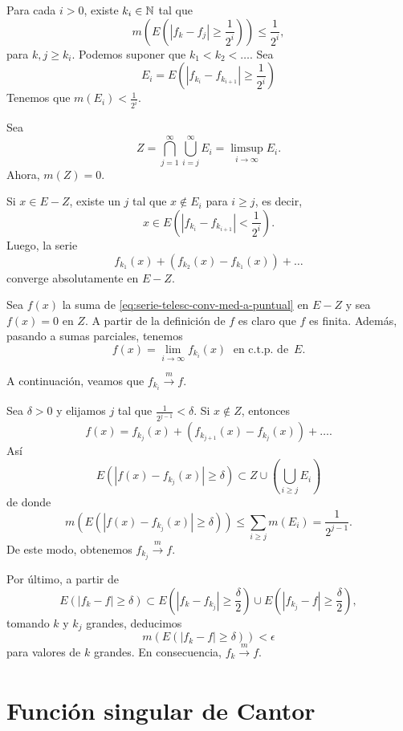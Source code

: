 \begin{demo}
Para cada $i>0$, existe $k_i\in \mathbb{N}$ tal que 
\[
m\left(E\left(|f_k-f_j|\geq \frac{1}{2^i}\right)\right)\leq
\frac{1}{2^i},
\]
para $k,j\geq k_i$.
Podemos suponer que $k_1<k_2<\ldots$. Sea 
\[
E_i=E\left(   |f_{k_i} -f_{k_{i+1}}|\geq \frac{1}{2^i}\right)
\]
Tenemos que $m(E_i)<\frac{1}{2^i}$. 

Sea 
\[ Z=\bigcap\limits_{j=1}^{\infty}\bigcup\limits_{i=j}^{\infty} E_i
=\limsup\limits_{i \to \infty} E_i.
\]
Ahora, $m(Z)=0$. 

Si $x \in E-Z$, existe un $j$ tal que $x \notin E_i$ para $i\geq j$, es decir, 
\[
x\in E\left( \left|f_{k_i}-f_{k_{i+1}}\right|<\frac{1}{2^i}\right).
\]
Luego, la serie
\begin{equation}\label{eq:serie-telesc-conv-med-a-puntual}
f_{k_1}(x)+\left(f_{k_2}(x)-f_{k_1}(x)\right)+\ldots
\end{equation}
converge absolutamente en $E-Z$.

Sea $f(x)$ la suma de \eqref{eq:serie-telesc-conv-med-a-puntual} en $E-Z$ y sea $f(x)=0$ en $Z$. A partir de la definici\'on de $f$ es claro que $f$ es finita. Adem\'as, pasando a sumas parciales, tenemos
\[
f(x)=\lim\limits_{i \to \infty} f_{k_i}(x)\;\mbox{ en c.t.p. de } \,E.
\]

A continuaci\'on, veamos que $f_{k_i} \xrightarrow[]{m} f$.

Sea $\delta>0$ y elijamos $j$ tal que $\frac{1}{2^{j-1}}<\delta$. 
Si  $x\notin Z$, entonces 
\[
f(x)=
f_{k_j}(x)+\left(f_{k_{j+1}}(x)-f_{k_j}(x)\right)+\ldots.
\]
As\'i
\[
E\left(\left|f(x)-f_{k_j}(x)  \right|\geq \delta\right)\subset 
Z\cup \left(\bigcup\limits_{i\geq j} E_i\right)
\]
de donde
\[
m\left(
E\left(\left|f(x)-f_{k_j}(x)  \right|\geq \delta\right)
\right)
\leq \sum\limits_{i\geq j} m(E_i)=\frac{1}{2^{j-1}}.
\]
De este modo, obtenemos $f_{k_j} \xrightarrow[]{m} f$.

Por \'ultimo, a partir de 
\[
E\left(|f_k-f|\geq\delta\right)\subset 
E\left(|f_k -f_{k_j}|\geq \frac{\delta}{2}\right) \cup
E\left(|f_{k_j} -f|\geq \frac{\delta}{2}\right),
\]
tomando $k$ y $k_j$ grandes, deducimos
\[
m\left(E\left(\left|f_k-f\right|\geq \delta\right)\right)< \epsilon
\]
para valores de $k$ grandes. En consecuencia, $f_k \xrightarrow[]{m}f$.
\end{demo}

\section{Funci\'on singular de Cantor}

